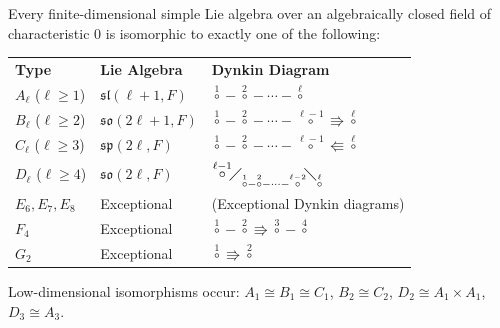 Every finite-dimensional simple Lie algebra over an algebraically closed field of characteristic 0 is isomorphic to exactly one of the following:

\begin{center}
\begin{tabular}{lll}
\textbf{Type} & \textbf{Lie Algebra} & \textbf{Dynkin Diagram} \\
$A_\ell$ ($\ell \geq 1$) & $\mathfrak{sl}(\ell+1, F)$ & $\overset{1}{\circ}\!-\!\overset{2}{\circ}\!-\!\cdots\!-\!\overset{\ell}{\circ}$ \\
$B_\ell$ ($\ell \geq 2$) & $\mathfrak{so}(2\ell+1, F)$ & $\overset{1}{\circ}\!-\!\overset{2}{\circ}\!-\!\cdots\!-\!\overset{\ell-1}{\circ}\!\Rrightarrow\!\overset{\ell}{\circ}$ \\
$C_\ell$ ($\ell \geq 3$) & $\mathfrak{sp}(2\ell, F)$ & $\overset{1}{\circ}\!-\!\overset{2}{\circ}\!-\!\cdots\!-\!\overset{\ell-1}{\circ}\!\Lleftarrow\!\overset{\ell}{\circ}$ \\
$D_\ell$ ($\ell \geq 4$) & $\mathfrak{so}(2\ell, F)$ & $\overset{\ell-1}{\circ}\!\diagup_{\overset{1}{\circ}-\overset{2}{\circ}-\cdots-\overset{\ell-2}{\circ}}\!\diagdown_{\overset{\ell}{\circ}}$ \\
$E_6, E_7, E_8$ & Exceptional & (Exceptional Dynkin diagrams) \\
$F_4$ & Exceptional & $\overset{1}{\circ}\!-\!\overset{2}{\circ}\!\Rrightarrow\!\overset{3}{\circ}\!-\!\overset{4}{\circ}$ \\
$G_2$ & Exceptional & $\overset{1}{\circ}\!\Rrightarrow\!\overset{2}{\circ}$
\end{tabular}
\end{center}

Low-dimensional isomorphisms occur: $A_1 \cong B_1 \cong C_1$, $B_2 \cong C_2$, $D_2 \cong A_1 \times A_1$, $D_3 \cong A_3$.
